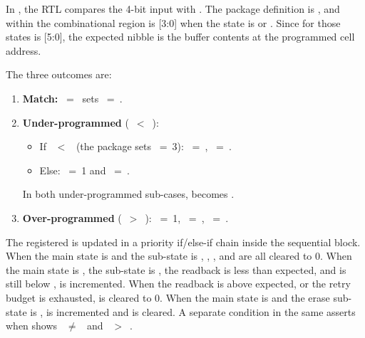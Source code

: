 In , the RTL compares the 4-bit
 input with . The
package definition is ,
and within the combinational region  is
[3:0] when the state is  or
. Since  for those states is
[5:0], the expected nibble is the buffer contents
at the programmed cell address.

The three outcomes are:

\begin{enumerate}
    \item \textbf{Match:}
          ~=~ sets
          ~=~.
    \item \textbf{Under-programmed}
          (~\(<\)~):
          \begin{itemize}
              \item If ~\(<\)~
                    (the package sets ~=~3):
                    ~=~,
                    ~=~.
              \item Else:
                    ~=~1 and
                    ~=~.
          \end{itemize}
          In both under-programmed sub-cases, 
          becomes .
    \item \textbf{Over-programmed}
          (~\(>\)~):
          ~=~1,
          ~=~,
          ~=~.
\end{enumerate}

The registered  is updated in a priority
if/else-if chain inside the sequential block. When the main state is
 and the sub-state is ,
, , and
 are all cleared to 0. When the main state is
, the sub-state is , the readback
is less than expected, and  is still below
,  is incremented. When
the readback is above expected, or the retry budget is exhausted,
 is cleared to 0. When the main state is
 and the erase sub-state is ,
 is incremented and  is
cleared. A separate condition in the same  asserts
 when  shows
~\(\ne\)~ and
~\(>\)~.

